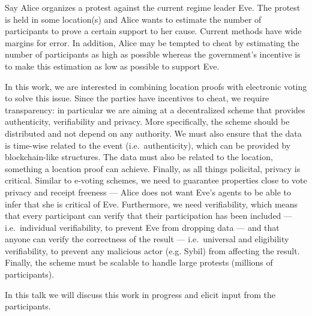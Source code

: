 Say Alice organizes a protest against the current regime leader Eve.
The protest is held in some location(s) and Alice wants to estimate the number 
of participants to prove a certain support to her cause.
Current methods have wide margins for error.
In addition, Alice may be tempted to cheat by estimating the number of 
participants as high as possible whereas the government's incentive is to make 
this estimation as low as possible to support Eve.
                                                                                  
In this work, we are interested in combining location proofs with electronic 
voting to solve this issue.
Since the parties have incentives to cheat, we require transparency: in 
particular we are aiming at a decentralized scheme that provides authenticity, 
verifiability and privacy.
More specifically, the scheme should be distributed and not depend on any 
authority.
We must also ensure that the data is time-wise related to the event (i.e.\ 
authenticity), which can be provided by blockchain-like structures.
The data must also be related to the location, something a location proof can 
achieve.
Finally, as all things policital, privacy is critical.
Similar to e-voting schemes, we need to guarantee properties close to vote 
privacy and receipt freeness --- Alice does not want Eve's agents to be able to 
infer that she is critical of Eve.
Furthermore, we need verifiability, which means that every participant can 
verify that their participation has been included --- i.e.\ individual 
verifiability, to prevent Eve from dropping data --- and that anyone
can verify the correctness of the result --- i.e.\ universal and eligibility
verifiability, to prevent any malicious actor (e.g. Sybil) from affecting the 
result.
Finally, the scheme must be scalable to handle large protests (millions of 
participants).

In this talk we will discuss this work in progress and elicit input from the 
participants.

